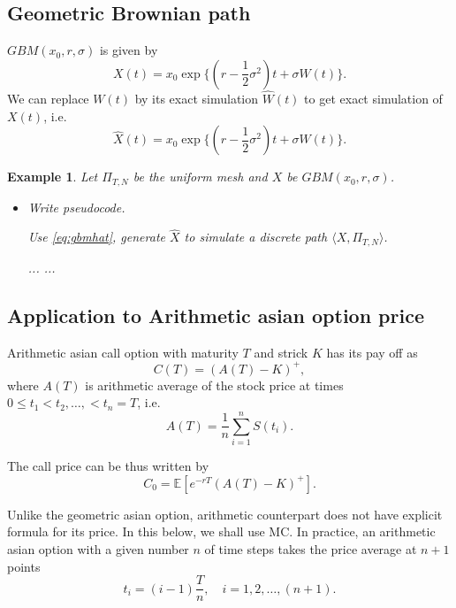 \documentclass{article}
\newtheorem{example}{Example}
\begin{document}
\subsection{Geometric Brownian path}
$GBM(x_0, r, \sigma)$  is given by
$$X(t) = x_0 \exp\{(r - \frac 1 2 \sigma^2)t + \sigma W(t)\}.$$
We can replace $W(t)$ by its exact simulation $\hat W(t)$ to get exact simulation of $X(t)$, i.e.
\begin{equation}\label{eq:gbmhat}
\hat X(t) = x_0 \exp\{(r - \frac 1 2 \sigma^2)t + \sigma \hat W(t)\}.
\end{equation}


\begin{example}\label{exm:gbm}
Let $\Pi_{T, N}$ be the uniform mesh and $X$ be $GBM(x_0, r, \sigma)$.
\begin{itemize}
\item 
Write pseudocode.
\begin{algorithm}
\caption{ Use  \eqref{eq:gbmhat}, generate $\hat X$ to simulate a discrete path $\langle X, \Pi_{T, N}\rangle$.  }
\label{alg:gbm}
\begin{algorithmic}[1]
\State   ...
\State  ...
\EndProcedure
\end{algorithmic}
\end{algorithm}

\end{itemize}


\end{example}

\subsection{Application to Arithmetic asian option price}
Arithmetic asian call option with maturity $T$ and strick $K$ has its pay off as
$$C(T) = (A(T) - K)^+,$$
where $A(T)$ is arithmetic average of the stock price at times
$0 \le t_1 < t_2, \ldots, < t_n = T$, i.e.
$$A(T) = \frac{1}{n} \sum_{i=1}^n S(t_i).$$

The call price can be thus written by
$$C_0 = \mathbb E [e^{-rT} (A(T) - K)^+].$$


Unlike the geometric asian option, arithmetic counterpart does not have explicit formula for its price.
In this below, we shall use MC. 
In practice, an arithmetic asian option with a given number $n$ 
of time steps takes the price average at $n+1$ points
$$t_i = (i-1) \frac{T}{n}, \quad i = 1, 2, \ldots, (n+1).$$
\end{document}
